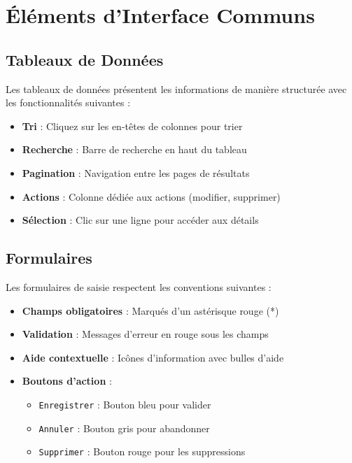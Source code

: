\documentclass[12pt,a4paper]{report}
\begin{document}
\section{Éléments d'Interface Communs}

\subsection{Tableaux de Données}

Les tableaux de données présentent les informations de manière structurée avec les fonctionnalités suivantes :

\begin{itemize}[leftmargin=*]
    \item \textbf{Tri} : Cliquez sur les en-têtes de colonnes pour trier
    \item \textbf{Recherche} : Barre de recherche en haut du tableau
    \item \textbf{Pagination} : Navigation entre les pages de résultats
    \item \textbf{Actions} : Colonne dédiée aux actions (modifier, supprimer)
    \item \textbf{Sélection} : Clic sur une ligne pour accéder aux détails
\end{itemize}

\subsection{Formulaires}

Les formulaires de saisie respectent les conventions suivantes :

\begin{itemize}[leftmargin=*]
    \item \textbf{Champs obligatoires} : Marqués d'un astérisque rouge (*)
    \item \textbf{Validation} : Messages d'erreur en rouge sous les champs
    \item \textbf{Aide contextuelle} : Icônes d'information avec bulles d'aide
    \item \textbf{Boutons d'action} :
    \begin{itemize}
        \item \texttt{Enregistrer} : Bouton bleu pour valider
        \item \texttt{Annuler} : Bouton gris pour abandonner
        \item \texttt{Supprimer} : Bouton rouge pour les suppressions
    \end{itemize}
\end{itemize}
\end{document}
